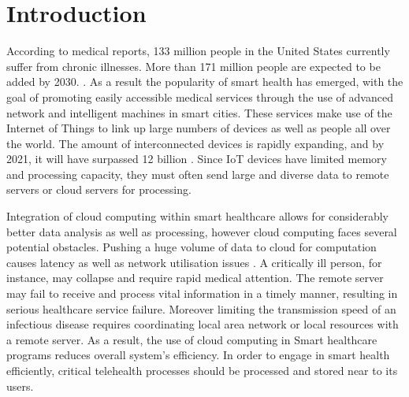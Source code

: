 \documentclass[10pt]{article}
\begin{document}



\tableofcontents
\thispagestyle{empty}
\cleardoublepage
\setcounter{page}{1}






\section{Introduction}  

According to medical reports, 133 million people in the United States currently suffer from chronic illnesses. More than 171 million people are expected to be added by 2030. \cite{1}. As a result the popularity of smart health has emerged, with the goal of promoting easily accessible medical services through the use of advanced network and intelligent machines in smart cities. These services make use of the Internet of Things to link up large numbers of devices as well as people all over the world. The amount of interconnected devices is rapidly expanding, and by 2021, it will have surpassed 12 billion \cite{0}.
Since IoT devices have limited memory and processing capacity, they must often send large and diverse data to remote servers or cloud servers for processing. 
\newline

Integration of cloud computing within smart healthcare allows for considerably better data analysis as well as processing, however cloud computing faces several potential obstacles. Pushing a huge volume of data to cloud for computation causes latency as well as network utilisation issues \cite{3}.  A critically ill person, for instance, may collapse and require rapid medical attention. The remote server may fail to receive and process vital information in a timely manner, resulting in serious healthcare service failure. Moreover limiting the transmission speed of an infectious disease requires coordinating local area network or local resources with a remote server. As a result, the use of cloud computing in Smart healthcare programs reduces overall system's efficiency. In order to engage in smart health efficiently, critical telehealth processes should be processed and stored near to its users.
\newline
\end{document}
